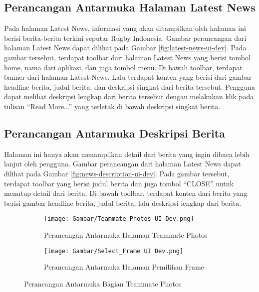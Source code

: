 \subsection{Perancangan Antarmuka Halaman Latest News}

Pada halaman Latest News, informasi yang akan ditampilkan oleh halaman ini berisi berita-berita terkini seputar Rugby Indonesia. Gambar perancangan dari halaman Latest News dapat dilihat pada Gambar \ref{fig:latest-news-ui-dev}. Pada gambar tersebut, terdapat toolbar dari halaman Latest News yang berisi tombol home, nama dari aplikasi, dan juga tombol menu. Di bawah toolbar, terdapat banner dari halaman Latest News. Lalu terdapat konten yang berisi dari gambar headline berita, judul berita, dan deskripsi singkat dari berita tersebut. Pengguna dapat melihat deskripsi lengkap dari berita tersebut dengan melakukan klik pada tulisan ``Read More...'' yang terletak di bawah deskripsi singkat berita.

\subsection{Perancangan Antarmuka Deskripsi Berita}

Halaman ini hanya akan menampilkan detail dari berita yang ingin dibaca lebih lanjut oleh pengguna. Gambar perancangan dari halaman Latest News dapat dilihat pada Gambar \ref{fig:news-description-ui-dev}. Pada gambar tersebut, terdapat toolbar yang berisi judul berita dan juga tombol ``CLOSE'' untuk menutup detail dari berita. Di bawah toolbar, terdapat konten dari berita yang berisi gambar headline berita, judul berita, lalu deskripsi lengkap dari berita.

\begin{figure}[H]
     \centering
     \begin{subfigure}[b]{0.3\textwidth}
        \centering
        \texttt{[image: Gambar/Teammate\_Photos UI Dev.png]}
        \caption{Perancangan Antarmuka Halaman Teammate Photos}
        \label{fig:teammate-photos-ui-dev}
     \end{subfigure}
     \hspace*{0.5in}
     \begin{subfigure}[b]{0.3\textwidth}
        \centering
        \texttt{[image: Gambar/Select\_Frame UI Dev.png]}
        \caption{Perancangan Antarmuka Halaman Pemilihan Frame}
        \label{fig:select-frame-ui-dev}
     \end{subfigure}
        \caption{Perancangan Antarmuka Bagian Teammate Photos}
        \label{fig:teammate-photos-page-full-design}
\end{figure}

